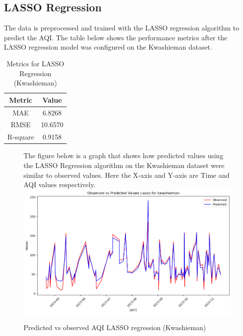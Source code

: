\documentclass{book}
\numberwithin{equation}{section}
\numberwithin{figure}{section}
\begin{document}
\subsection{LASSO Regression}
The data is preprocessed and trained with the LASSO regression algorithm to predict the AQI. The table below shows the performance metrics after the LASSO regression model was configured on the Kwashieman dataset.
\begin{table}[H]
    \centering
    \begin{tabular}{|c|c|}
        \hline
        \textbf{Metric} & \textbf{Value} \\
        \hline
        MAE & 6.8268 \\
        \hline
        RMSE & 10.6570 \\
        \hline
        R-square & 0.9158 \\
        \hline
    \end{tabular}
    \caption{Metrics for LASSO Regression (Kwashieman)}
    \label{tab:LASSO metrics(Kwashieman)}
\end{table}
\begin{figure}[H]
 \begin{minipage}{\linewidth}
        The figure below is a graph that shows how predicted values using the LASSO Regression algorithm on the Kwashieman dataset were similar to observed values. Here the X-axis and Y-axis are Time and AQI values respectively.
        \vspace{0.5em} 
        \includegraphics[width=\linewidth]{kwashieman LASSO.png}
       
        \caption{ Predicted vs observed AQI LASSO regression (Kwashieman)}
        \label{fig: LASSO predicted vs observed AQICkwashieman)}
    \end{minipage}
\end{figure}
\end{document}
